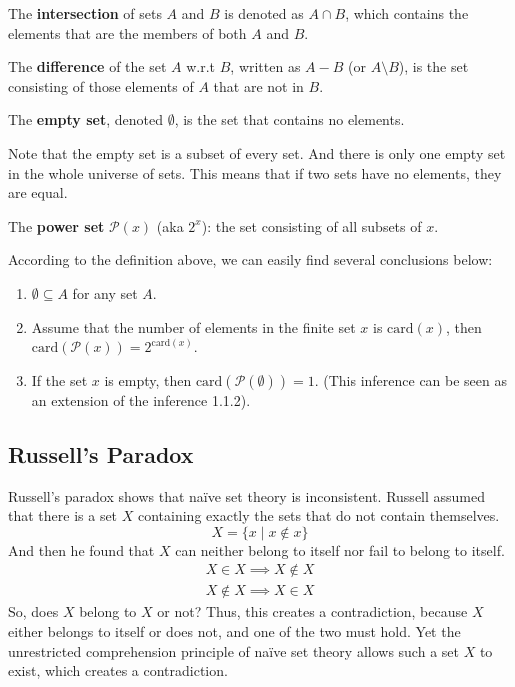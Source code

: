 \begin{definition}
The \textbf{intersection} of sets $A$ and $B$ is denoted as $A \cap B$, which contains the elements that are the members of both $A$ and $B$.
\end{definition}

\begin{definition}
The \textbf{difference} of the set $A$ w.r.t $B$, written as $A - B$ (or $A \setminus B$), is the set consisting of those elements of $A$ that are not in $B$.
\end{definition}

\begin{definition}
The \textbf{empty set}, denoted $\emptyset$, is the set that contains no elements.
\end{definition}

Note that the empty set is a subset of every set. And there is only one empty set in the whole universe of sets. This means that if two sets have no elements, they are equal.

\begin{definition}
The \textbf{power set} $\mathcal{P}(x)$ (aka $2^{x}$): the set consisting of all subsets of $x$.
\end{definition}

According to the definition above, we can easily find several conclusions below:
\begin{inference}
\begin{enumerate}

\item $\emptyset \subseteq A$ for any set $A$.

\item Assume that the number of elements in the finite set $x$ is $\text{card}(x)$, then $\text{card}(\mathcal{P}(x)) = 2^{\text{card}(x)}$.

\item If the set $x$ is empty, then $\text{card}(\mathcal{P}(\emptyset)) = 1$. (This inference can be seen as an extension of the inference 1.1.2).

\end{enumerate}
\end{inference}

\subsection*{Russell’s Paradox}
Russell’s paradox shows that naïve set theory is inconsistent. Russell assumed that there is a set $X$ containing exactly the sets that do not contain themselves.
$$ X = \{ x \mid x \notin x \} $$
And then he found that $X$ can neither belong to itself nor fail to belong to itself.
\begin{align*}
    X \in X \implies X \notin X \\
    X \notin X \implies X \in X
\end{align*}
So, does $X$ belong to $X$ or not? Thus, this creates a contradiction, because $X$ either belongs to itself or does not, and one of the two must hold. Yet the unrestricted comprehension principle of naïve set theory allows such a set $X$ to exist, which creates a contradiction.

